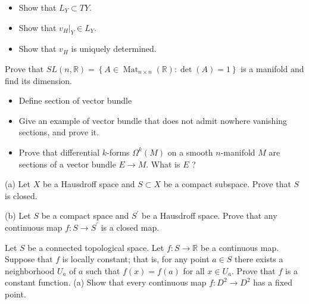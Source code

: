 \documentclass[14pt]{extarticle}
\begin{document}
\begin{itemize}
  \item Show that $L_{Y} \subset T Y$.

  \item Show that $\left.v_{H}\right|_{Y} \in L_{Y}$.

  \item Show that $v_{H}$ is uniquely determined.

\end{itemize}
\newpage
 Prove that $S L(n, \mathbb{R})=\left\{A \in \operatorname{Mat}_{n \times n}(\mathbb{R}): \operatorname{det}(A)=1\right\}$ is a manifold and find its dimension.
\newpage
\begin{itemize}
\item Define section of vector bundle


  \item Give an example of vector bundle that does not admit nowhere vanishing sections, and prove it.

  \item Prove that differential $k$-forms $\Omega^{k}(M)$ on a smooth $n$-manifold $M$ are sections of a vector bundle $E \rightarrow M$. What is $E$ ?

\end{itemize}


\newpage
(a) Let $X$ be a Hausdroff space and $S \subset X$ be a compact subspace. Prove that $S$ is closed.

(b) Let $S$ be a compact space and $S^{\prime}$ be a Hausdroff space. Prove that any continuous map $f: S \rightarrow S^{\prime}$ is a closed map.

\newpage
Let $S$ be a connected topological space. Let $f: S \rightarrow \mathbb{R}$ be a continuous map. Suppose that $f$ is locally constant; that is, for any point $a \in S$ there exists a neighborhood $U_{a}$ of $a$ such that $f(x)=f(a)$ for all $x \in U_{a}$. Prove that $f$ is a constant function.
(a) Show that every continuous map $f: D^{2} \rightarrow D^{2}$ has a fixed point.
\end{document}
